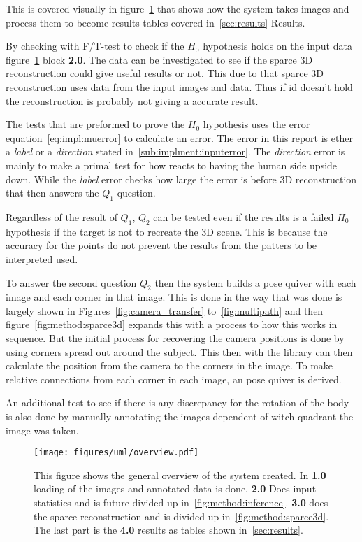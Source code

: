 This is covered visually in figure~\ref{fig:method:overview} that shows how the system takes images and process them to become results tables covered in~\ref{sec:results} Results.

By checking with F/T-test to check if the $H_0$ hypothesis holds on the input data figure~\ref{fig:method:overview} block \textbf{2.0}.
The data can be investigated to see if the sparce 3D reconstruction could give useful results or not.
This due to that sparce 3D reconstruction uses data from the input images and data.
Thus if id doesn't hold the reconstruction is probably not giving a accurate result.

The tests that are preformed to prove the $H_0$ hypothesis uses the error equation~\ref{eq:impl:muerror} to calculate an error.
The error in this report is ether a \textit{label} or a \textit{direction} stated in~\ref{sub:implment:inputerror}.
The \textit{direction} error is mainly to make a primal test for how \openpose{ } reacts to having the human side upside down.
While the \textit{label} error checks how large the error is before 3D reconstruction that then answers the $Q_1$ question.

Regardless of the result of $Q_1$, $Q_2$  can be tested even if the results is a failed $H_0$ hypothesis if the target is not to recreate the 3D scene.
This is because the accuracy for the points do not prevent the results from the \arcuo{ } patters to be interpreted used.

To answer the second question $Q_2$ then the system builds a pose quiver with each image and each corner in that image.
This is done in the way that was done is largely shown in Figures~\ref{fig:camera_transfer} to~\ref{fig:multipath} and then figure~\ref{fig:method:sparce3d} expands this with a process to how this works in sequence.
But the initial process for recovering the camera positions is done by using \aruco{ } corners spread out around the subject.
This then with the \aruco{ } library can then calculate the position from the camera to the \acuro{ } corners in the image.
To make relative connections from each corner in each image, an pose quiver is derived.

An additional test to see if there is any discrepancy for the rotation of the body is also done by manually annotating the images dependent of witch quadrant
the image was taken.



\begin{figure}
\begin{center}
    \texttt{[image: figures/uml/overview.pdf]}
\end{center}
\caption{This figure shows the general overview of the system created. In \textbf{1.0} loading of the images and annotated data is done.
    \textbf{2.0} Does input statistics and is future divided up in~\ref{fig:method:inference}. \textbf{3.0} does the sparce reconstruction and is divided up in~\ref{fig:method:sparce3d}.
The last part is the \textbf{4.0} results as tables shown in~\ref{sec:results}.}\label{fig:method:overview}
\end{figure}

